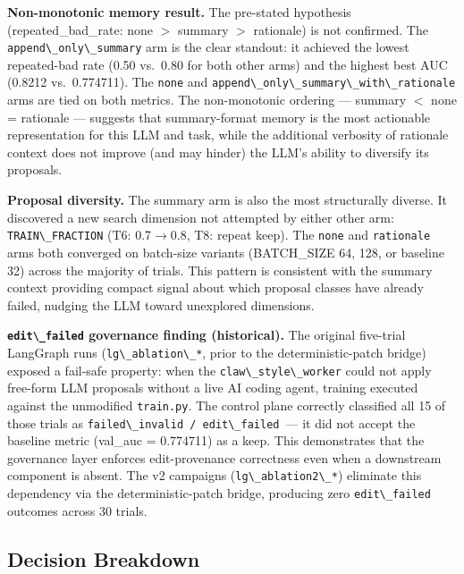 \textbf{Non-monotonic memory result.} The pre-stated hypothesis (repeated\_bad\_rate: none $>$ summary $>$ rationale) is not confirmed. The \passthrough{\lstinline!append\_only\_summary!} arm is the clear standout: it achieved the lowest repeated-bad rate (0.50 vs.\ 0.80 for both other arms) and the highest best AUC (0.8212 vs.\ 0.774711). The \passthrough{\lstinline!none!} and \passthrough{\lstinline!append\_only\_summary\_with\_rationale!} arms are tied on both metrics. The non-monotonic ordering --- summary $<$ none = rationale --- suggests that summary-format memory is the most actionable representation for this LLM and task, while the additional verbosity of rationale context does not improve (and may hinder) the LLM's ability to diversify its proposals.

\textbf{Proposal diversity.} The summary arm is also the most structurally diverse. It discovered a new search dimension not attempted by either other arm: \passthrough{\lstinline!TRAIN\_FRACTION!} (T6: 0.7$\to$0.8, T8: repeat keep). The \passthrough{\lstinline!none!} and \passthrough{\lstinline!rationale!} arms both converged on batch-size variants (BATCH\_SIZE 64, 128, or baseline 32) across the majority of trials. This pattern is consistent with the summary context providing compact signal about which proposal classes have already failed, nudging the LLM toward unexplored dimensions.

\textbf{\passthrough{\lstinline!edit\_failed!} governance finding (historical).} The original five-trial LangGraph runs (\passthrough{\lstinline!lg\_ablation\_*!}, prior to the deterministic-patch bridge) exposed a fail-safe property: when the \passthrough{\lstinline!claw\_style\_worker!} could not apply free-form LLM proposals without a live AI coding agent, training executed against the unmodified \passthrough{\lstinline!train.py!}. The control plane correctly classified all 15 of those trials as \passthrough{\lstinline!failed\_invalid / edit\_failed!}~--- it did not accept the baseline metric (val\_auc = 0.774711) as a keep. This demonstrates that the governance layer enforces edit-provenance correctness even when a downstream component is absent. The v2 campaigns (\passthrough{\lstinline!lg\_ablation2\_*!}) eliminate this dependency via the deterministic-patch bridge, producing zero \passthrough{\lstinline!edit\_failed!} outcomes across 30 trials.

\subsection{Decision Breakdown}\label{decision-breakdown}

